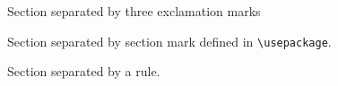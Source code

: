 \documentclass{article}
\begin{document}
Section separated by three exclamation marks
\sectionbreak[!!!]

Section separated by section mark defined in \verb|\usepackage|.
\sectionbreak

Section separated by a rule.
\sectionbreakmark{\rule{10em}{3pt}}
\sectionbreak
\end{document}

